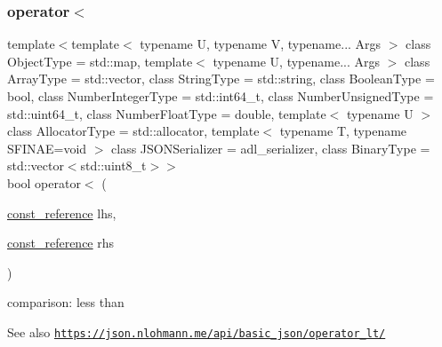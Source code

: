 \subsubsection{\texorpdfstring{operator$<$}{operator<}\hspace{0.1cm}{\footnotesize\ttfamily [1/3]}}
{\footnotesize\ttfamily template$<$template$<$ typename U, typename V, typename... Args $>$ class Object\+Type = std\+::map, template$<$ typename U, typename... Args $>$ class Array\+Type = std\+::vector, class String\+Type  = std\+::string, class Boolean\+Type  = bool, class Number\+Integer\+Type  = std\+::int64\+\_\+t, class Number\+Unsigned\+Type  = std\+::uint64\+\_\+t, class Number\+Float\+Type  = double, template$<$ typename U $>$ class Allocator\+Type = std\+::allocator, template$<$ typename T, typename S\+F\+I\+N\+A\+E=void $>$ class J\+S\+O\+N\+Serializer = adl\+\_\+serializer, class Binary\+Type  = std\+::vector$<$std\+::uint8\+\_\+t$>$$>$ \\
bool operator$<$ (\begin{DoxyParamCaption}\item[{\hyperlink{classnlohmann_1_1basic__json_ab8a1c33ee7b154fc41ca2545aa9724e6}{const\+\_\+reference}}]{lhs,  }\item[{\hyperlink{classnlohmann_1_1basic__json_ab8a1c33ee7b154fc41ca2545aa9724e6}{const\+\_\+reference}}]{rhs }\end{DoxyParamCaption})\hspace{0.3cm}{\ttfamily [friend]}}



comparison\+: less than 

\begin{DoxySeeAlso}{See also}
\href{https://json.nlohmann.me/api/basic_json/operator_lt/}{\tt https\+://json.\+nlohmann.\+me/api/basic\+\_\+json/operator\+\_\+lt/} 
\end{DoxySeeAlso}
\mbox{\label{classnlohmann_1_1basic__json_a52907b78829a55473f2548530cf2c1c7}} 
